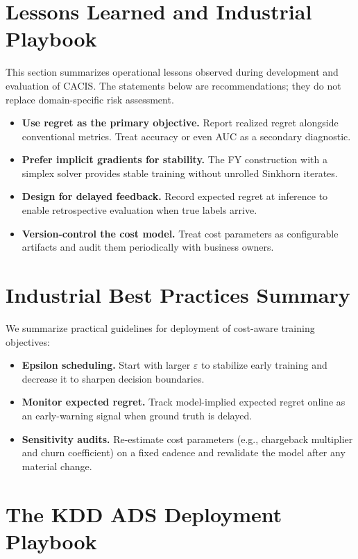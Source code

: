 \documentclass[sigconf,anonymous]{acmart}
\newcommand{\CACIS}{\textsc{CACIS}}
\begin{document}
\section{Lessons Learned and Industrial Playbook}

This section summarizes operational lessons observed during development and evaluation of \CACIS{}. The statements below are recommendations; they do not replace domain-specific risk assessment.
\begin{itemize}[leftmargin=1.2em, itemsep=0.2em, topsep=0.2em]
  \item \textbf{Use regret as the primary objective.} Report realized regret alongside conventional metrics. Treat accuracy or even AUC as a secondary diagnostic.
  \item \textbf{Prefer implicit gradients for stability.} The FY construction with a simplex solver provides stable training without unrolled Sinkhorn iterates.
  \item \textbf{Design for delayed feedback.} Record expected regret at inference to enable retrospective evaluation when true labels arrive.
  \item \textbf{Version-control the cost model.} Treat cost parameters as configurable artifacts and audit them periodically with business owners.
\end{itemize}

\section{Industrial Best Practices Summary}

We summarize practical guidelines for deployment of cost-aware training objectives:
\begin{itemize}[leftmargin=1.2em, itemsep=0.2em, topsep=0.2em]
  \item \textbf{Epsilon scheduling.} Start with larger $\varepsilon$ to stabilize early training and decrease it to sharpen decision boundaries.
  \item \textbf{Monitor expected regret.} Track model-implied expected regret online as an early-warning signal when ground truth is delayed.
  \item \textbf{Sensitivity audits.} Re-estimate cost parameters (e.g., chargeback multiplier and churn coefficient) on a fixed cadence and revalidate the model after any material change.
\end{itemize}

\section{The KDD ADS Deployment Playbook}
\end{document}
